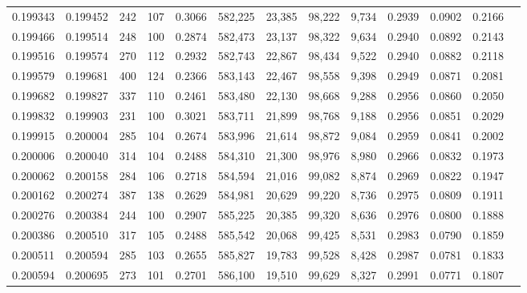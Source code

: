 \begin{tabular}{rrrrrrrrrrrrr}
0.199343 & 0.199452 &   242 & 107 &                                     0.3066 & 582,225 &  23,385 &  98,222 &   9,734 & 0.2939 & 0.0902 & 0.2166 \\
0.199466 & 0.199514 &   248 & 100 &                                     0.2874 & 582,473 &  23,137 &  98,322 &   9,634 & 0.2940 & 0.0892 & 0.2143 \\
0.199516 & 0.199574 &   270 & 112 &                                     0.2932 & 582,743 &  22,867 &  98,434 &   9,522 & 0.2940 & 0.0882 & 0.2118 \\
0.199579 & 0.199681 &   400 & 124 &                                     0.2366 & 583,143 &  22,467 &  98,558 &   9,398 & 0.2949 & 0.0871 & 0.2081 \\
0.199682 & 0.199827 &   337 & 110 &                                     0.2461 & 583,480 &  22,130 &  98,668 &   9,288 & 0.2956 & 0.0860 & 0.2050 \\
0.199832 & 0.199903 &   231 & 100 &                                     0.3021 & 583,711 &  21,899 &  98,768 &   9,188 & 0.2956 & 0.0851 & 0.2029 \\
0.199915 & 0.200004 &   285 & 104 &                                     0.2674 & 583,996 &  21,614 &  98,872 &   9,084 & 0.2959 & 0.0841 & 0.2002 \\
0.200006 & 0.200040 &   314 & 104 &                                     0.2488 & 584,310 &  21,300 &  98,976 &   8,980 & 0.2966 & 0.0832 & 0.1973 \\
0.200062 & 0.200158 &   284 & 106 &                                     0.2718 & 584,594 &  21,016 &  99,082 &   8,874 & 0.2969 & 0.0822 & 0.1947 \\
0.200162 & 0.200274 &   387 & 138 &                                     0.2629 & 584,981 &  20,629 &  99,220 &   8,736 & 0.2975 & 0.0809 & 0.1911 \\
0.200276 & 0.200384 &   244 & 100 &                                     0.2907 & 585,225 &  20,385 &  99,320 &   8,636 & 0.2976 & 0.0800 & 0.1888 \\
0.200386 & 0.200510 &   317 & 105 &                                     0.2488 & 585,542 &  20,068 &  99,425 &   8,531 & 0.2983 & 0.0790 & 0.1859 \\
0.200511 & 0.200594 &   285 & 103 &                                     0.2655 & 585,827 &  19,783 &  99,528 &   8,428 & 0.2987 & 0.0781 & 0.1833 \\
0.200594 & 0.200695 &   273 & 101 &                                     0.2701 & 586,100 &  19,510 &  99,629 &   8,327 & 0.2991 & 0.0771 & 0.1807 \\

\end{tabular}
